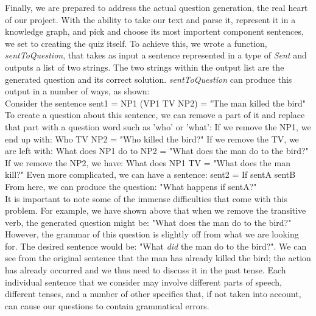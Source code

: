 \documentclass[finalcopy]{srpaper}
\begin{document}
Finally, we are prepared to address the actual question generation, the real heart of our project. With the ability to take our text and parse it, represent it in a knowledge graph, and pick and choose its most importent component sentences, we set to creating the quiz itself.
\newline
To achieve this, we wrote a function, \textit{sentToQuestion}, that takes as input a sentence represented in a type of \textit{Sent} and outputs a list of two strings. The two strings within the output list are the generated question and its correct solution. \textit{sentToQuestion} can produce this output in a number of ways, as shown:
\newline
\\
Consider the sentence sent1 = NP1 (VP1 TV NP2) = "The man killed the bird"
\newline
\\
To create a question about this sentence, we can remove a part of it and replace that part with a question word such as 'who' or 'what':
\newline
If we remove the NP1, we end up with: Who TV NP2 = "Who killed the bird?"
\newline
If we remove the TV, we are left with: What does NP1 do to NP2 = "What does the man do to the bird?"
\newline
If we remove the NP2, we have: What does NP1 TV = "What does the man kill?"
\newline
Even more complicated, we can have a sentence: sent2 = If sentA sentB
\newline
From here, we can produce the question: "What happens if sentA?"
\newline
\\
It is important to note some of the immense difficulties that come with this problem. For example, we have shown above that when we remove the transitive verb, the generated question might be: "What does the man do to the bird?" However, the grammar of this question is slightly off from what we are looking for. The desired sentence would be: "What \textit{did} the man do to the bird?". We can see from the original sentence that the man has already killed the bird; the action has already occurred and we thus need to discuss it in the past tense. Each individual sentence that we consider may involve different parts of speech, different tenses, and a number of other specifics that, if not taken into account, can cause our questions to contain grammatical errors.
\end{document}
